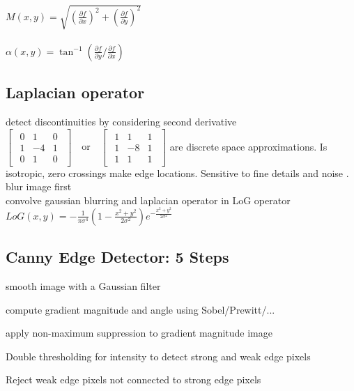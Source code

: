 \\
$M(x, y) = \sqrt{(\frac{\partial f}{\partial x})^{2} + (\frac{\partial f}{\partial y})^{2}}$\\
 \\
$\alpha(x, y) = \tan^{-1}(\frac{\partial f}{\partial y} / \frac{\partial f}{\partial x})$
\subsection*{Laplacian operator}
detect discontinuities by considering second derivative
$\begin{bmatrix}
    \begin{smallmatrix}
        0 & 1 & 0\\
        1 & -4 & 1\\
        0 & 1 & 0
    \end{smallmatrix}
\end{bmatrix}
\quad \text{or} \quad
\begin{bmatrix}
    \begin{smallmatrix}
        1 & 1 & 1\\
        1 & -8 & 1\\
        1 & 1 & 1
    \end{smallmatrix}
\end{bmatrix}$
are discrete space approximations. Is isotropic, zero crossings make edge locations. Sensitive to fine details and noise .\\ blur image first \\
 convolve gaussian blurring and laplacian operator in LoG operator  $LoG(x, y) = -\frac{1}{\pi \sigma^{4}} (1 - \frac{x^{2} + y^{2}}{2\sigma^{2}}) e^{-\frac{x^{2} + y^{2}}{2\sigma^{2}}}$
\subsection*{Canny Edge Detector: 5 Steps}
\begin{compactenum}
    \item smooth image with a Gaussian filter
    \item compute gradient magnitude and angle using Sobel/Prewitt/...
    \item apply non-maximum suppression to gradient magnitude image 
    \item Double thresholding for intensity to detect strong and weak edge pixels
    \item Reject weak edge pixels not connected to strong edge pixels
\end{compactenum}
